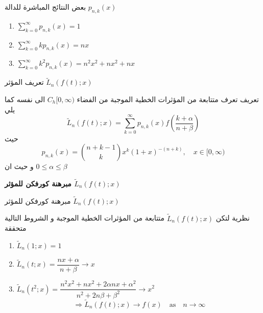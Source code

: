 	\begin{frame}
		\begin{exampleblock}{بعض النتائج المباشرة للدالة $p_{n,k}(x)$}
			\begin{english}
				\begin{enumerate}
					\item $\sum_{k=0}^{\infty} p_{n,k}(x) = 1$
					\item $\sum_{k=0}^{\infty}k p_{n,k}(x) = nx$
					\item $\sum_{k=0}^{\infty}k^2 p_{n,k}(x) = n^2 x^2 + nx^2 + nx$
				\end{enumerate}
			\end{english}
		\end{exampleblock}
	\end{frame}
	\newcommand{\tL}{\tilde{L}}
	\begin{frame}{تعريف المؤثر $\tL_n(f(t);x)$}
		\begin{exampleblock}{تعريف}
			تعرف متتابعة من المؤثرات الخطية الموجبة من الفضاء $C_h[0, \infty)$ الى نفسه كما يلي
			\[
			\tL_n(f(t); x) = \sum_{k=0}^{\infty} p_{n, k}(x) f\left(\frac{k+\alpha}{n+\beta}\right)
			\]
			حيث
			\[
			p_{n,k} (x) = \binom{n+k-1}{k} x^k (1+x)^{-(n+k)}, \quad x \in [0, \infty)
			\]
			و حيث ان $0 \leq \alpha\leq \beta$
			
		\end{exampleblock}
	\end{frame}
	
	\begin{frame}
\begin{center}
	\Huge\textbf{مبرهنة كورفكن للمؤثر $\tL_n(f(t); x)$}
\end{center}
	\end{frame}
	
	\begin{frame}{مبرهنة كورفكن للمؤثر $\tL_n(f(t); x)$}
		\begin{exampleblock}{نظرية}	
		لتكن $\tL_n(f(t);x)$ متتابعة من المؤثرات الخطية الموجبة  و الشروط التالية متحققة
		\begin{english}
			\begin{enumerate}
				\item $\tL_n(1;x)=1$
				\item $\tL_n(t;x) = \dfrac{nx + \alpha}{n + \beta} \to x$
				\item $\tL_n(t^2;x) = \dfrac{n^2x^2 + nx^2 + 2\alpha n x + \alpha^2}{n^2 + 2n\beta+ \beta^2} \to x^2$
				\[
				\Rightarrow\tL_n(f(t);x) \to f(x) \quad\text{as}\quad n\to \infty
				\]
			\end{enumerate}
		\end{english}
		\end{exampleblock}
	\end{frame}
	
